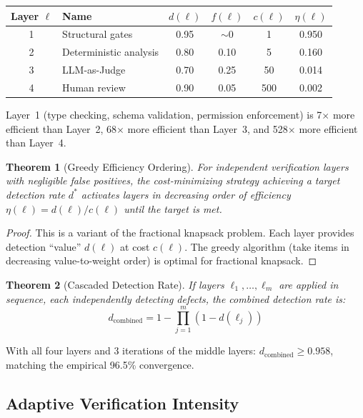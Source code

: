\documentclass[11pt, a4paper, logo, copyright]{googledeepmind}
\newtheorem{theorem}{Theorem}[section]
\begin{document}
\begin{center}
\begin{tabular}{clcccc}
\toprule
Layer $\ell$ & Name & $d(\ell)$ & $f(\ell)$ & $c(\ell)$ & $\eta(\ell)$ \\
\midrule
1 & Structural gates & 0.95 & ${\sim}0$ & 1 & 0.950 \\
2 & Deterministic analysis & 0.80 & 0.10 & 5 & 0.160 \\
3 & LLM-as-Judge & 0.70 & 0.25 & 50 & 0.014 \\
4 & Human review & 0.90 & 0.05 & 500 & 0.002 \\
\bottomrule
\end{tabular}
\end{center}

Layer~1 (type checking, schema validation, permission enforcement) is 7$\times$ more efficient than Layer~2, 68$\times$ more efficient than Layer~3, and 528$\times$ more efficient than Layer~4.

\begin{theorem}[Greedy Efficiency Ordering]
For independent verification layers with negligible false positives, the cost-minimizing strategy achieving a target detection rate $d^*$ activates layers in decreasing order of efficiency $\eta(\ell) = d(\ell)/c(\ell)$ until the target is met.
\end{theorem}

\begin{proof}
This is a variant of the fractional knapsack problem.
Each layer provides detection ``value'' $d(\ell)$ at cost $c(\ell)$.
The greedy algorithm (take items in decreasing value-to-weight order) is optimal for fractional knapsack.
\end{proof}

\begin{theorem}[Cascaded Detection Rate]
If layers $\ell_1, \ldots, \ell_m$ are applied in sequence, each independently detecting defects, the combined detection rate is:
\begin{equation}
d_{\text{combined}} = 1 - \prod_{j=1}^{m} (1 - d(\ell_j))
\end{equation}
\end{theorem}

With all four layers and 3 iterations of the middle layers: $d_{\text{combined}} \geq 0.958$, matching the empirical 96.5\% convergence.

\subsection{Adaptive Verification Intensity}
\end{document}
